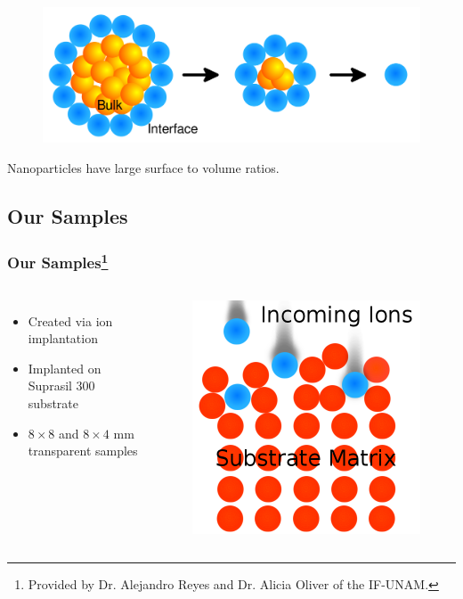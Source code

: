\documentclass{beamer}
\begin{document}
\begin{frame}
\begin{figure}
\centering
\includegraphics[width=\textwidth]{atoms}
\end{figure}
\begin{center}
Nanoparticles have large surface to volume ratios.
\end{center}
\end{frame}

\subsection{Our Samples}
\begin{frame}
\frametitle{Our Samples\footnote{Provided by Dr. Alejandro Reyes and Dr. Alicia Oliver of the IF-UNAM.}}
\begin{columns}
\begin{itemize}
\item Created via ion implantation
\item Implanted on Suprasil 300 substrate
\item $8\times8$ and $8\times4$ mm transparent samples
\end{itemize}
\begin{figure}
\centering
\includegraphics[width=\textwidth]{ions}
\end{figure}
\end{columns}
\end{frame}
\end{document}
